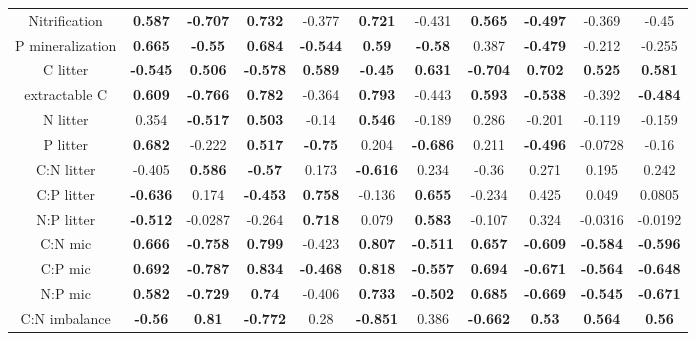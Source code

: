 \documentclass[authoryear,preprint,review,12pt]{elsarticle}
\begin{document}
\begin{table}[h!]
\begin{center}
{\begin{tabular}{ccccccccccc}
  Nitrification & \textbf{ 0.587 } & \textbf{ -0.707 } & \textbf{ 0.732 } & -0.377 & \textbf{ 0.721 } & -0.431 & \textbf{ 0.565 } & \textbf{ -0.497 } & -0.369 & -0.45 \\ 
  P mineralization & \textbf{ 0.665 } & \textbf{ -0.55 } & \textbf{ 0.684 } & \textbf{ -0.544 } & \textbf{ 0.59 } & \textbf{ -0.58 } & 0.387 & \textbf{ -0.479 } & -0.212 & -0.255 \\ 
  C litter & \textbf{ -0.545 } & \textbf{ 0.506 } & \textbf{ -0.578 } & \textbf{ 0.589 } & \textbf{ -0.45 } & \textbf{ 0.631 } & \textbf{ -0.704 } & \textbf{ 0.702 } & \textbf{ 0.525 } & \textbf{ 0.581 } \\ 
  extractable C & \textbf{ 0.609 } & \textbf{ -0.766 } & \textbf{ 0.782 } & -0.364 & \textbf{ 0.793 } & -0.443 & \textbf{ 0.593 } & \textbf{ -0.538 } & -0.392 & \textbf{ -0.484 } \\ 
  N litter & 0.354 & \textbf{ -0.517 } & \textbf{ 0.503 } & -0.14 & \textbf{ 0.546 } & -0.189 & 0.286 & -0.201 & -0.119 & -0.159 \\ 
  P litter & \textbf{ 0.682 } & -0.222 & \textbf{ 0.517 } & \textbf{ -0.75 } & 0.204 & \textbf{ -0.686 } & 0.211 & \textbf{ -0.496 } & -0.0728 & -0.16 \\ 
  C:N litter & -0.405 & \textbf{ 0.586 } & \textbf{ -0.57 } & 0.173 & \textbf{ -0.616 } & 0.234 & -0.36 & 0.271 & 0.195 & 0.242 \\ 
  C:P litter & \textbf{ -0.636 } & 0.174 & \textbf{ -0.453 } & \textbf{ 0.758 } & -0.136 & \textbf{ 0.655 } & -0.234 & 0.425 & 0.049 & 0.0805 \\ 
  N:P litter & \textbf{ -0.512 } & -0.0287 & -0.264 & \textbf{ 0.718 } & 0.079 & \textbf{ 0.583 } & -0.107 & 0.324 & -0.0316 & -0.0192 \\ 
  C:N mic & \textbf{ 0.666 } & \textbf{ -0.758 } & \textbf{ 0.799 } & -0.423 & \textbf{ 0.807 } & \textbf{ -0.511 } & \textbf{ 0.657 } & \textbf{ -0.609 } & \textbf{ -0.584 } & \textbf{ -0.596 } \\ 
  C:P mic & \textbf{ 0.692 } & \textbf{ -0.787 } & \textbf{ 0.834 } & \textbf{ -0.468 } & \textbf{ 0.818 } & \textbf{ -0.557 } & \textbf{ 0.694 } & \textbf{ -0.671 } & \textbf{ -0.564 } & \textbf{ -0.648 } \\ 
  N:P mic & \textbf{ 0.582 } & \textbf{ -0.729 } & \textbf{ 0.74 } & -0.406 & \textbf{ 0.733 } & \textbf{ -0.502 } & \textbf{ 0.685 } & \textbf{ -0.669 } & \textbf{ -0.545 } & \textbf{ -0.671 } \\ 
  C:N imbalance & \textbf{ -0.56 } & \textbf{ 0.81 } & \textbf{ -0.772 } & 0.28 & \textbf{ -0.851 } & 0.386 & \textbf{ -0.662 } & \textbf{ 0.53 } & \textbf{ 0.564 } & \textbf{ 0.56 } \\ 

\end{tabular}}
\end{center}
\end{table}
\end{document}
